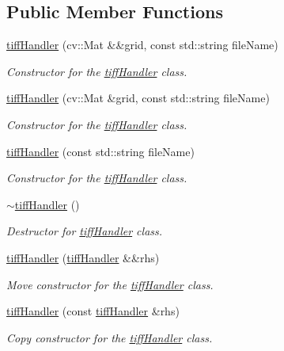 \subsection*{Public Member Functions}
\begin{DoxyCompactItemize}
\item 
\hyperlink{classtiffHandler_a9274e4f4c7985eb580303d66e0e72cf5}{tiff\+Handler} (cv\+::\+Mat \&\&grid, const std\+::string file\+Name)
\begin{DoxyCompactList}\small\item\em Constructor for the \hyperlink{classtiffHandler}{tiff\+Handler} class. \end{DoxyCompactList}\item 
\hyperlink{classtiffHandler_ae0de58defa2ae8612dab8a751ef23e07}{tiff\+Handler} (cv\+::\+Mat \&grid, const std\+::string file\+Name)
\begin{DoxyCompactList}\small\item\em Constructor for the \hyperlink{classtiffHandler}{tiff\+Handler} class. \end{DoxyCompactList}\item 
\hyperlink{classtiffHandler_a00f75f3ff7af2c7c972e7290f4797501}{tiff\+Handler} (const std\+::string file\+Name)
\begin{DoxyCompactList}\small\item\em Constructor for the \hyperlink{classtiffHandler}{tiff\+Handler} class. \end{DoxyCompactList}\item 
\hyperlink{classtiffHandler_a0c9cbb41ee7faac8dbe193e778ba2c8b}{$\sim$tiff\+Handler} ()
\begin{DoxyCompactList}\small\item\em Destructor for \hyperlink{classtiffHandler}{tiff\+Handler} class. \end{DoxyCompactList}\item 
\hyperlink{classtiffHandler_a7bfe3d9b0553461580dcfb8467ec9d6d}{tiff\+Handler} (\hyperlink{classtiffHandler}{tiff\+Handler} \&\&rhs)
\begin{DoxyCompactList}\small\item\em Move constructor for the \hyperlink{classtiffHandler}{tiff\+Handler} class. \end{DoxyCompactList}\item 
\hyperlink{classtiffHandler_af4ae13fb1aa69b262fd6e95cf5b4addb}{tiff\+Handler} (const \hyperlink{classtiffHandler}{tiff\+Handler} \&rhs)
\begin{DoxyCompactList}\small\item\em Copy constructor for the \hyperlink{classtiffHandler}{tiff\+Handler} class. \end{DoxyCompactList}\item 

\end{DoxyCompactItemize}
